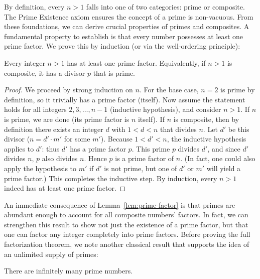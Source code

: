 \documentclass[11pt]{article}
\begin{document}
By definition, every $n > 1$ falls into one of two categories: prime or composite. The Prime Existence axiom ensures the concept of a prime is non-vacuous. From these foundations, we can derive crucial properties of primes and composites. A fundamental property to establish is that every number possesses at least one prime factor. We prove this by induction (or via the well-ordering principle):

\begin{lemma}\label{lem:prime-factor}
Every integer $n > 1$ has at least one prime factor. Equivalently, if $n>1$ is composite, it has a divisor $p$ that is prime.
\end{lemma}

\begin{proof}
We proceed by strong induction on $n$. For the base case, $n=2$ is prime by definition, so it trivially has a prime factor (itself). Now assume the statement holds for all integers $2,3,\ldots, n-1$ (inductive hypothesis), and consider $n>1$. If $n$ is prime, we are done (its prime factor is $n$ itself). If $n$ is composite, then by definition there exists an integer $d$ with $1 < d < n$ that divides $n$. Let $d'$ be this divisor ($n = d' \cdot m'$ for some $m'$). Because $1 < d' < n$, the inductive hypothesis applies to $d'$: thus $d'$ has a prime factor $p$. This prime $p$ divides $d'$, and since $d'$ divides $n$, $p$ also divides $n$. Hence $p$ is a prime factor of $n$. (In fact, one could also apply the hypothesis to $m'$ if $d'$ is not prime, but one of $d'$ or $m'$ will yield a prime factor.) This completes the inductive step. By induction, every $n>1$ indeed has at least one prime factor.
\end{proof}

An immediate consequence of Lemma~\ref{lem:prime-factor} is that primes are abundant enough to account for all composite numbers' factors. In fact, we can strengthen this result to show not just the existence of a prime factor, but that one can factor any integer completely into prime factors. Before proving the full factorization theorem, we note another classical result that supports the idea of an unlimited supply of primes:

\begin{proposition}\label{prop:infinitude}
There are infinitely many prime numbers.
\end{proposition}
\end{document}

